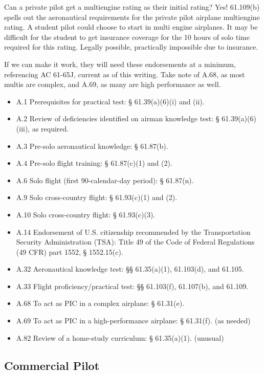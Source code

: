 Can a private pilot get a multiengine rating as their initial rating?
Yes! 61.109(b) spells out the aeronautical requirements
for the private pilot airplane multiengine rating. A student pilot could choose to start in multi
engine airplanes. It may be difficult for the student to get insurance coverage for the 10 hours
of solo time required for this rating. Legally possible, practically impossible due to insurance.

If we can make it work, they will need these endorsements at a minimum, referencing AC 61-65J, current as of this writing. Take note of A.68, as most multis are complex, and A.69, as many are high performance as well.

\begin{itemize}
\item A.1 Prerequisites for practical test: § 61.39(a)(6)(i) and (ii).
\item A.2 Review of deficiencies identified on airman knowledge test: § 61.39(a)(6)(iii), as
required.
\item A.3 Pre-solo aeronautical knowledge: § 61.87(b).
\item A.4 Pre-solo flight training: § 61.87(c)(1) and (2).
\item A.6 Solo flight (first 90-calendar-day period): § 61.87(n).
\item A.9 Solo cross-country flight: § 61.93(c)(1) and (2).
\item A.10 Solo cross-country flight: § 61.93(c)(3).
\item A.14 Endorsement of U.S. citizenship recommended by the Transportation Security
Administration (TSA): Title 49 of the Code of Federal Regulations (49 CFR)
part 1552, § 1552.15(c).
\item A.32 Aeronautical knowledge test: §§ 61.35(a)(1), 61.103(d), and 61.105.
\item A.33 Flight proficiency/practical test: §§ 61.103(f), 61.107(b), and 61.109.
\item A.68 To act as PIC in a complex airplane: § 61.31(e).
\item A.69 To act as PIC in a high-performance airplane: § 61.31(f). (as needed)
\item A.82 Review of a home-study curriculum: § 61.35(a)(1). (unusual)
\end{itemize}

\subsection{Commercial Pilot}

